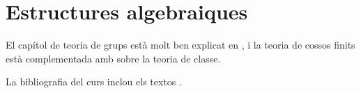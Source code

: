\documentclass[../segon.tex]{subfiles}
\begin{document}
\part{Estructures algebraiques}



\printbibliography
El capítol de teoria de grups està molt ben explicat en \cite{NumerosGruposyAnillos}, i la teoria de cossos finits està complementada amb \cite{AntoineRosaCampsMoncasiIntroduccioAlgebraAbstracta} sobre la teoria de classe.

La bibliografia del curs inclou els textos \cite{NumerosGruposyAnillos, AntoineRosaCampsMoncasiIntroduccioAlgebraAbstracta, CedoAlgebraBasica, CohnBasicAlgebra, FelixConcepcionSebastianIntroduccionAlAlgebra, FraleighFirstCourseAbstractAlgebra, HungerfordAlgebra}.
\end{document}
